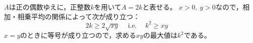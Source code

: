 \documentclass{article}
\begin{document}
$A$は正の偶数ゆえに，正整数$k$を用いて$A = 2k$と表せる。
$x > 0,\ y > 0$なので，相加・相乗平均の関係によって次が成り立つ：
\begin{equation*}
    2k \geq 2 \sqrt{xy} \hspace{15pt} \mbox{i.e.} \hspace{15pt} k^2 \geq xy
\end{equation*}
$x = y$のときに等号が成り立つので，求める$xy$の最大値は$k^2$である。
\end{document}

